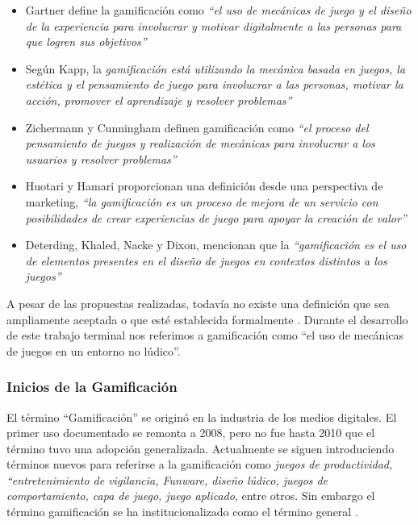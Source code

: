     \begin{itemize}

        \item Gartner define la gamificación como {\it ``el uso de mecánicas de juego y 
        el diseño de la experiencia para involucrar y motivar digitalmente a las personas para 
        que logren sus objetivos''} \cite{Burke}
        
        \item Según Kapp, la {\it gamificación está utilizando la mecánica basada en juegos, 
        la estética y el pensamiento de juego para involucrar a las personas, motivar la acción, 
        promover el aprendizaje y resolver problemas''} \cite{Kapp}
        
        \item Zichermann y Cunningham definen gamificación como {\it ``el proceso del 
        pensamiento de juegos y realización de mecánicas para involucrar a los usuarios y resolver 
        problemas''} \cite{GamByDesign} %
        
        \item Huotari y Hamari proporcionan una definición desde una perspectiva de marketing,
        {\it ``la gamificación es un proceso de mejora de un servicio con posibilidades de crear
        experiencias de juego para apoyar la creación de valor''} \cite{Huotari}  %
        
        \item Deterding, Khaled, Nacke y Dixon, mencionan que la {\it ``gamificación
        es el uso de elementos presentes en el diseño de juegos en contextos distintos a
        los juegos''} \cite{DeterdingDefinition} %
    
    \end{itemize}

\noindent A pesar de las propuestas realizadas, todavía no existe una definición que sea ampliamente aceptada o que esté establecida formalmente \cite{Seaborn}. Durante el desarrollo de este trabajo terminal nos referimos a gamificación como ``el uso de mecánicas de juegos en un entorno no lúdico''.


\subsubsection{Inicios de la Gamificación}

El término ``Gamificación'' se originó en la industria de los medios digitales. El primer uso documentado se remonta a 2008, pero no fue hasta 2010 que el término tuvo una adopción generalizada. Actualmente se siguen introduciendo términos nuevos para referirse a la gamificación como {\it juegos de productividad, ``entretenimiento de vigilancia, Funware, diseño lúdico, juegos de comportamiento, capa de juego, juego aplicado}, entre otros. Sin embargo el término gamificación se ha institucionalizado como el término general \cite{DeterdingGamefulness}.\\
    
